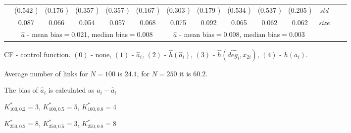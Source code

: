 \begin{table}
\begin{threeparttable}
{\begin{tabular}{|c|c|c|c|c|c|c|c|c|c|c|c|c|c|}
&(0.542 )&(0.176 )&(0.357 )&(0.357 )&(0.167 )&(0.303 )&(0.179 )&(0.534 )&(0.537 )&(0.205 )&\textit{std}\\ 
& 0.087 & 0.066 &0.054 &0.057 &0.068 &0.075& 0.092& 0.065 &0.062 &0.062 &\textit{size} \\\midrule 
&\multicolumn{5}{|c|}{$\hat{a}$ - mean bias$=$0.021, median bias$=$0.008 }&\multicolumn{5}{|c|}{$\hat{a}$ - mean bias$=$0.008, median bias$=$0.003 }&\\ \hline 
\end{tabular}} 
\begin{tablenotes}\tiny 
\item CF - control function. $(0)$ - none, $(1)$ - $\hat{a}_i$,  $(2)$ - $\hat{h}(\hat{a}_i)$, $(3)$ - $\hat{h}(\widehat{deg}_i,x_{2i})$, $(4)$ - $h(a_i)$. 
\item Average number of links for $N=100$ is $24.1$, for $N=250$ it is $60.2$. 
\item The bias of $\hat{a}_i$ is calculated as $a_i-\hat{a}_i$ 
\item $K^*_{100,0.2}=3$, $K^*_{100,0.5}=5$, $K^*_{100,0.8}=4$ 
\item $K^*_{250,0.2}=8$, $K^*_{250,0.5}=3$, $K^*_{250,0.8}=8$ 
  \end{tablenotes} 
\end{threeparttable} 
\end{table} 
